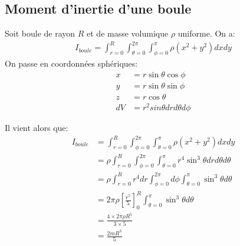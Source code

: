 \documentclass[12pt]{article}
\begin{document}
\subsection{Moment d'inertie d'une boule}
\label{boule}
Soit  boule de rayon $R$ et de masse volumique $\rho$ uniforme. On a:
\begin{align}
    I_{boule} = \int_{r=0}^{R}\int_{\theta=0}^{2\pi}\int_{\phi=0}^{\pi} \rho (x^2 + y^2) dxdy
\end{align}
On passe en coordonnées sphériques:
\begin{align*}
    x &= r \sin \theta \cos \phi \\
    y &= r \sin \theta \sin \phi \\
    z &= r \cos \theta \\
    dV &= r^2 sin \theta dr d\theta d\phi
\end{align*}

\break
Il vient alors que:
\begin{align*}
    I_{boule} & = \int_{r=0}^{R}\int_{\phi=0}^{2\pi}\int_{\theta=0}^{\pi} \rho (x^2 + y^2) dxdy \\
    & = \rho \int_{r=0}^{R}\int_{\phi=0}^{2\pi}\int_{\theta=0}^{\pi} r^4 \sin^3 \theta dr d\theta d\theta \\
    & = \rho \int_{r=0}^{R} r^4 dr \int_{\phi=0}^{2\pi} d\phi \int_{\theta=0}^{\pi} \sin^3 \theta d\theta \\
    & = 2\pi \rho \left[ \frac{r^5}{5} \right]_0^R \int_{\theta=0}^{\pi} \sin^3 \theta d\theta \\
    & = \frac{4 \times 2 \pi \rho R^5}{3 \times 5 } \\
    & = \frac{2 m R^3}{5}
\end{align*}
\end{document}
